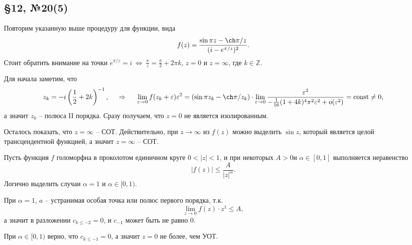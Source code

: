 \subsection*{\S12, №20(5)}

Повторим указанную выше процедуру для функции, вида
\begin{equation*}
    f(z) = \frac{\sin \pi z - \ch \pi/z}{(i - e^{\pi/z})^2}.
\end{equation*}
Стоит обратить внимание на точки $e^{\pi/z} = i \ \Leftrightarrow \ \frac{\pi}{z} = \frac{\pi}{2} + 2 \pi k$, $z = 0$ и $z = \infty$, где $k \in \mathbb{Z}$. 

Для начала заметим, что
\begin{equation*}
    z_k = - i\left(\frac{1}{2}  + 2k\right)^{-1},
    \hspace{0.5cm} \Rightarrow \hspace{0.5cm}
    \lim_{\varepsilon \to 0} f(z_k + \varepsilon) \varepsilon^2 = 
    \left(\sin \pi z_k - \ch \pi/z_k \right) \cdot \lim_{\varepsilon \to 0} \frac{\varepsilon^2}{- \frac{1}{16} (1 + 4k)^4 \pi^2 \varepsilon^2 + o(\varepsilon^2)} = \const \neq 0,
\end{equation*}
а значит $z_k$ -- полюса II порядка. 
Сразу получаем, что $z = 0$ не является изолированным.  

Осталось показать, что $z = \infty$ -- СОТ. Действительно, при $z \to \infty$ из $f(z)$ можно выделить $\sin z$, который является целой трансцендентной функцией, а значит $z = \infty$ -- СОТ. 





Пусть функция $f$ голоморфна в проколотом единичном круге $0 < |z| < 1$, и при некоторых $A > 0$и $\alpha \in [0, 1]$ выполняется неравенство
\begin{equation*}
    |f(z) | \leq \frac{A}{|z|^\alpha}.
\end{equation*}
Логично выделить случаи $\alpha = 1$ и $\alpha \in [0, 1)$. 

При $\alpha = 1$, $a$ -- устранимая особая точка или полюс первого порядка, т.к. 
\begin{equation*}
    \lim_{z \to 0} f(z) \cdot z^{1} \leq A, 
\end{equation*}
а значит в разложении $c_{k\leq -2} =0$, и $c_{-1}$ может быть не равно 0.


При $\alpha \in [0, 1)$ верно, что $c_{k \leq -1} = 0$, а значит $z = 0$  не более, чем УОТ.





